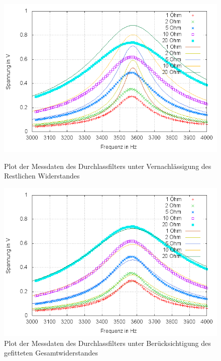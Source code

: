 \begin{figure}
        \includegraphics[width=.9\textwidth]{images/plot/durchlassfilter+theorie+R_ges.png}
\caption{Plot der Messdaten des Durchlassfilters unter Vernachlässigung des Restlichen Widerstandes}
\label{plot:durchlass+R_ges}

	\includegraphics[width=.9\textwidth]{images/plot/durchlassfilter+theorie+R_ges-fit.png}
\caption{Plot der Messdaten des Durchlassfilters unter Berücksichtigung des gefitteten Gesamtwiderstandes}
\label{plot:durchlass+R_ges-fit}
\end{figure}
